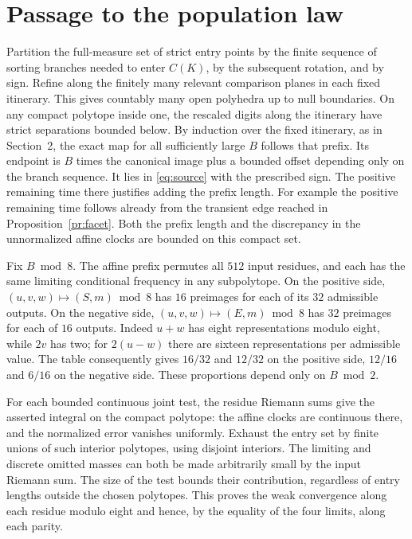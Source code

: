 \documentclass[11pt,reqno]{amsart}
\begin{document}
\section{Passage to the population law}
Partition the full-measure set of strict entry points by the finite
sequence of sorting branches needed to enter $C(K)$, by the subsequent
rotation, and by sign. Refine along the finitely many relevant comparison
planes in each fixed itinerary. This gives countably many open polyhedra
up to null boundaries. On any compact polytope inside one, the rescaled
digits along the itinerary have strict separations bounded below. By
induction over the fixed itinerary, as in Section~2, the exact map for all
sufficiently large $B$ follows that prefix. Its
endpoint is $B$ times the canonical image plus a bounded offset depending
only on the branch sequence. It lies in \eqref{eq:source} with the
prescribed sign. The positive remaining time there justifies adding the
prefix length. For example the positive remaining time follows already
from the transient edge reached in Proposition~\ref{pr:facet}. Both the
prefix length and the discrepancy in the unnormalized affine clocks are
bounded on this compact set.

Fix $B\bmod8$. The affine prefix permutes all $512$ input residues, and
each has the same limiting conditional frequency in any subpolytope.
On the positive side, $(u,v,w)\mapsto(S,m)\bmod8$ has $16$ preimages for
each of its $32$ admissible outputs. On the negative side,
$(u,v,w)\mapsto(E,m)\bmod8$ has $32$ preimages for each of $16$ outputs.
Indeed $u+w$ has eight representations modulo eight, while $2v$ has
two; for $2(u-w)$ there are sixteen representations per admissible
value. The table consequently gives $16/32$ and $12/32$ on the positive
side, $12/16$ and $6/16$ on the negative side. These proportions depend
only on $B\bmod2$.

For each bounded continuous joint test, the residue Riemann sums give the
asserted integral on the compact polytope: the affine clocks are continuous
there, and the normalized error vanishes uniformly. Exhaust the entry set
by finite unions of such interior polytopes, using disjoint interiors.
The limiting and discrete omitted masses can both be made arbitrarily small
by the input Riemann sum. The size of the test bounds their contribution,
regardless of entry lengths outside the chosen polytopes. This proves the
weak convergence along each residue modulo eight and hence, by the equality
of the four limits, along each parity.
\end{document}
